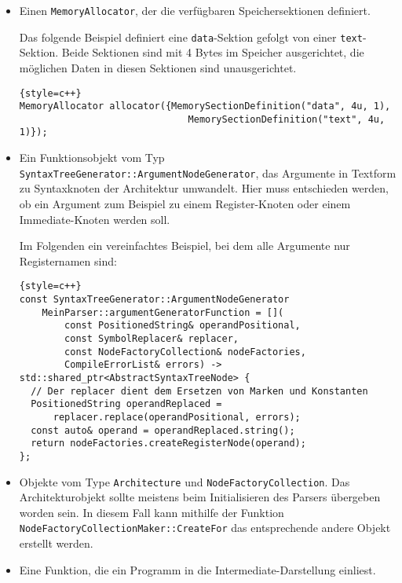 \begin{itemize}
\item Einen \texttt{Memory\-Allocator}, der die verfügbaren
Speichersektionen definiert.

Das folgende Beispiel definiert eine \texttt{data}-Sektion gefolgt von einer
\texttt{text}-Sektion. Beide Sektionen sind mit 4 Bytes im Speicher ausgerichtet,
die möglichen Daten in diesen Sektionen sind unausgerichtet.

\begin{lstlisting}{style=c++}
MemoryAllocator allocator({MemorySectionDefinition("data", 4u, 1),
                              MemorySectionDefinition("text", 4u, 1)});
\end{lstlisting}

\item Ein Funktionsobjekt vom Typ
\texttt{Syntax\-Tree\-Generator::\allowbreak{}Argument\-Node\-Generator}, das
Argumente in Textform zu Syntaxknoten der Architektur umwandelt. Hier muss
entschieden werden, ob ein Argument zum Beispiel zu einem Register-Knoten oder
einem Immediate-Knoten werden soll.

Im Folgenden ein vereinfachtes Beispiel, bei dem alle Argumente nur
Registernamen sind:

\begin{lstlisting}{style=c++}
const SyntaxTreeGenerator::ArgumentNodeGenerator
    MeinParser::argumentGeneratorFunction = [](
        const PositionedString& operandPositional,
        const SymbolReplacer& replacer,
        const NodeFactoryCollection& nodeFactories,
        CompileErrorList& errors) -> std::shared_ptr<AbstractSyntaxTreeNode> {
  // Der replacer dient dem Ersetzen von Marken und Konstanten
  PositionedString operandReplaced =
      replacer.replace(operandPositional, errors);
  const auto& operand = operandReplaced.string();
  return nodeFactories.createRegisterNode(operand);
};
\end{lstlisting}

\item Objekte vom Type \texttt{Architecture} und
\texttt{Node\-Factory\-Collection}. Das Architekturobjekt sollte meistens beim
Initialisieren des Parsers übergeben worden sein. In diesem Fall kann mithilfe der
Funktion \texttt{Node\-Factory\-Collection\-Maker::\allowbreak{}Create\-For} das
entsprechende andere Objekt erstellt werden.

\item Eine Funktion, die ein Programm in die Intermediate-Darstellung einliest.

\end{itemize}

